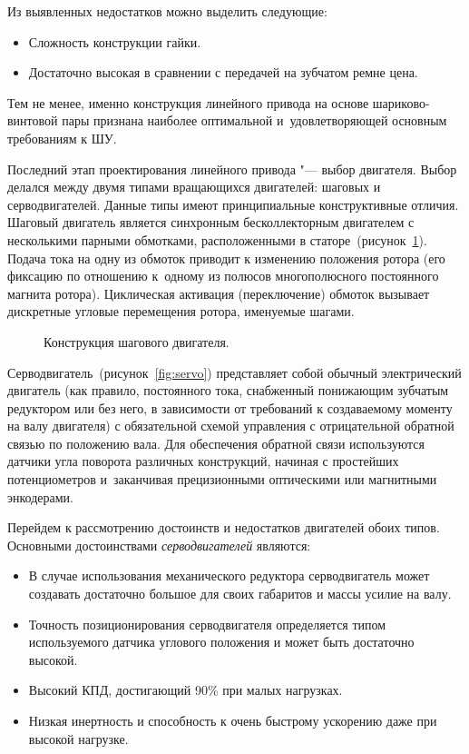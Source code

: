 Из выявленных недостатков можно выделить следующие:

\begin{itemize}
	\item Сложность конструкции гайки.
	
	\item Достаточно высокая в сравнении с передачей на зубчатом ремне цена.
\end{itemize}

Тем не менее, именно конструкция линейного привода на основе шариково-винтовой пары признана наиболее оптимальной и~удовлетворяющей основным требованиям к ШУ. 

Последний этап проектирования линейного привода "--- выбор двигателя. Выбор делался между двумя типами вращающихся двигателей: шаговых и серводвигателей. Данные типы имеют принципиальные конструктивные отличия. Шаговый двигатель является синхронным бесколлекторным двигателем с несколькими парными обмотками, расположенными в статоре~(рисунок~\cref{fig:stepper}). Подача тока на одну из обмоток приводит к изменению положения ротора (его фиксацию по отношению к~одному из полюсов многополюсного постоянного магнита ротора). Циклическая активация (переключение) обмоток вызывает дискретные угловые перемещения ротора, именуемые шагами.

\begin{figure}[ht]
	\caption{Конструкция шагового двигателя.}\label{fig:stepper}
\end{figure}

Серводвигатель~(рисунок~\cref{fig:servo}) представляет собой обычный электрический двигатель (как правило, постоянного тока, снабженный понижающим зубчатым редуктором или без него, в зависимости от требований к создаваемому моменту на валу двигателя) с обязательной схемой управления с отрицательной обратной связью по положению вала. Для обеспечения обратной связи используются датчики угла поворота различных конструкций, начиная с простейших потенциометров и~заканчивая прецизионными оптическими или магнитными энкодерами.

Перейдем к рассмотрению достоинств и недостатков двигателей обоих типов. Основными достоинствами \textit{серводвигателей} являются:

\begin{itemize}
	\item В случае использования механического редуктора серводвигатель может создавать достаточно большое для своих габаритов и массы усилие на валу.
	
	\item Точность позиционирования серводвигателя определяется типом используемого датчика углового положения и может быть достаточно высокой.
	
	\item Высокий КПД, достигающий 90\% при малых нагрузках.
	
	\item Низкая инертность и способность к очень быстрому ускорению даже при высокой нагрузке.	
\end{itemize}

